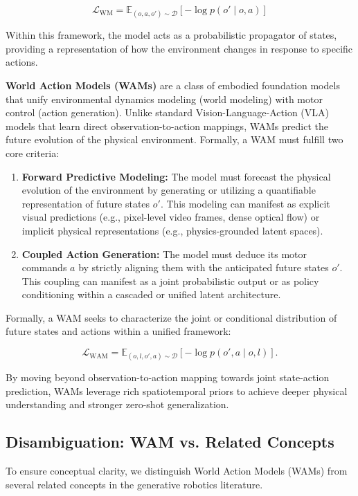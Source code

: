$$\mathcal{L}_{\text{WM}} = \mathbb{E}_{(o, a, o') \sim \mathcal{D}} 
\left[-\log p(o' \mid o, a)\right]$$


Within this framework, the model acts as a probabilistic propagator of states, providing a representation of how the environment changes in response to specific actions.


\textbf{World Action Models (WAMs)} are a class of embodied foundation models that unify environmental dynamics modeling (world modeling) with motor control (action generation). Unlike standard Vision-Language-Action (VLA) models that learn direct observation-to-action mappings, WAMs predict the future evolution of the physical environment. Formally, a WAM must fulfill two core criteria: 

\begin{enumerate}
    \item \textbf{Forward Predictive Modeling:}
    The model must forecast the physical evolution of the environment by generating or utilizing a quantifiable representation of future states $o'$. This modeling can manifest as explicit visual predictions (e.g., pixel-level video frames, dense optical flow) or implicit physical representations (e.g., physics-grounded latent spaces).
    
    \item \textbf{Coupled Action Generation:} The model must deduce its motor commands $a$ by strictly aligning them with the anticipated future states $o'$. This coupling can manifest as a joint probabilistic output or as policy conditioning within a cascaded or unified latent architecture.
\end{enumerate}

Formally, a WAM seeks to characterize the joint or conditional distribution of future states and actions within a unified framework:

$$\mathcal{L}_{\text{WAM}} = \mathbb{E}_{(o, l, o', a) \sim \mathcal{D}} \left[-\log p(o', a \mid o, l)\right].$$


By moving beyond observation-to-action mapping towards joint state-action prediction, WAMs leverage rich spatiotemporal priors to achieve deeper physical understanding and stronger zero-shot generalization.


\subsection{Disambiguation: WAM vs. Related Concepts}

To ensure conceptual clarity, we distinguish World Action Models (WAMs) from several related concepts in the generative robotics literature.

